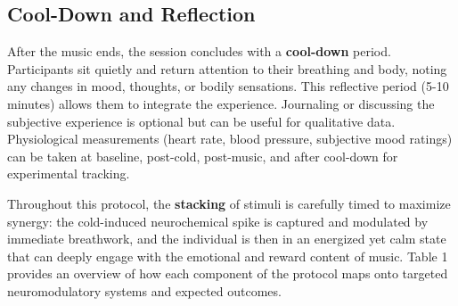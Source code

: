 \documentclass[11pt]{article}
\begin{document}
\subsection{Cool-Down and Reflection}
After the music ends, the session concludes with a \textbf{cool-down} period. Participants sit quietly and return attention to their breathing and body, noting any changes in mood, thoughts, or bodily sensations. This reflective period (5-10 minutes) allows them to integrate the experience. Journaling or discussing the subjective experience is optional but can be useful for qualitative data. Physiological measurements (heart rate, blood pressure, subjective mood ratings) can be taken at baseline, post-cold, post-music, and after cool-down for experimental tracking.

Throughout this protocol, the \textbf{stacking} of stimuli is carefully timed to maximize synergy: the cold-induced neurochemical spike is captured and modulated by immediate breathwork, and the individual is then in an energized yet calm state that can deeply engage with the emotional and reward content of music. Table 1 provides an overview of how each component of the protocol maps onto targeted neuromodulatory systems and expected outcomes.
\end{document}
